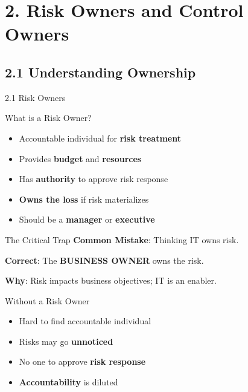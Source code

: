 \documentclass{beamer}
\begin{document}
	\section{2. Risk Owners and Control Owners}
	
	\subsection{2.1 Understanding Ownership}
	\begin{frame}{2.1 Risk Owners}
		\begin{block}{What is a Risk Owner?}
			\begin{itemize}
				\item Accountable individual for \textbf{risk treatment}
				\item Provides \textbf{budget} and \textbf{resources}
				\item Has \textbf{authority} to approve risk response
				\item \textbf{Owns the loss} if risk materializes
				\item Should be a \textbf{manager} or \textbf{executive}
			\end{itemize}
		\end{block}
		
		\begin{alertblock}{The Critical Trap}
			\textbf{Common Mistake}: Thinking IT owns risk.
			
			\textbf{Correct}: The \textbf{BUSINESS OWNER} owns the risk.
			
			\textbf{Why}: Risk impacts business objectives; IT is an enabler.
		\end{alertblock}
		
		\begin{block}{Without a Risk Owner}
			\begin{itemize}
				\item Hard to find accountable individual
				\item Risks may go \textbf{unnoticed}
				\item No one to approve \textbf{risk response}
				\item \textbf{Accountability} is diluted
			\end{itemize}
		\end{block}
	\end{frame}
	
\end{document}
